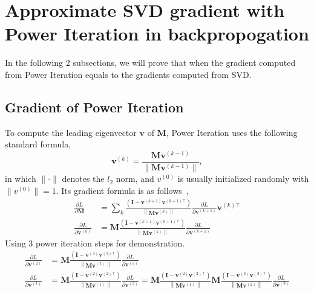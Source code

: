 \documentclass{article}
\newcommand{\bM}{\mathbf{M}}
\newcommand{\bv}{\mathbf{v}}
\newcommand{\bI}{\mathbf{I}}
\begin{document}
\newpage

\section{Approximate SVD gradient with Power Iteration in backpropogation}
In the following 2 subsections, we will prove that when the gradient computed from Power Iteration equals to the gradients computed from SVD.
	\subsection{Gradient of Power Iteration}
	\label{sec: pi}
	To compute the leading eigenvector $\bv$ of $\bM$, Power Iteration uses the following standard formula,
	\begin{equation}
	\bv^{(k)} = \frac{\bM\bv^{(k-1)}}{\| \bM\bv^{(k-1)} \|},
	\end{equation}
	in which $\| {\cdot} \|$ denotes the $l_2$ norm, and $v^{(0)}$ is usually initialized randomly with  $\|v^{(0)}\|{=}1$.
    Its gradient formula is as follows~\cite{ye2017dynamic},
	\begin{equation}
	\begin{aligned} 
	\frac{\partial L}{\partial \bM} &=\sum_{k} \frac{\left(\bI-\bv^{(k+1)} \bv^{(k+1)\top}\right)}{\left\|\bM \bv^{(k)}\right\|} \frac{\partial L}{\partial \bv^{(k+1)}} \bv^{(k)\top} \\
	\frac{\partial L}{\partial \bv^{(k)}} &=\bM \frac{\left(\bI-\bv^{(k+1)} \bv^{(k+1)\top}\right)}{\left\|\bM \bv^{(k)}\right\|} \frac{\partial L}{\partial \bv^{(k+1)}} 
	\end{aligned}
	\end{equation}
	Using 3 power iteration steps for demonstration.
	\begin{equation}
	\begin{aligned} 
	\frac{\partial L}{\partial \bv^{(2)}} &=\bM \frac{\left(\bI-\bv^{(3)} \bv^{(3)\top}\right)}{\left\|\bM \bv^{(2)}\right\|} \frac{\partial L}{\partial \bv^{(3)}}\\
	\frac{\partial L}{\partial \bv^{(1)}} &=\bM \frac{\left(\bI-\bv^{(2)} \bv^{(2)\top}\right)}{\left\|\bM \bv^{(1)}\right\|} \frac{\partial L}{\partial \bv^{(2)}}
	=\bM \frac{\left(\bI-\bv^{(2)} \bv^{(2)\top}\right)}{\left\|\bM \bv^{(1)}\right\|} 
	\bM \frac{\left(\bI-\bv^{(3)} \bv^{(3)\top}\right)}{\left\|\bM \bv^{(2)}\right\|} \frac{\partial L}{\partial \bv^{(3)}}
	\end{aligned}
	\end{equation}
	
\end{document}
